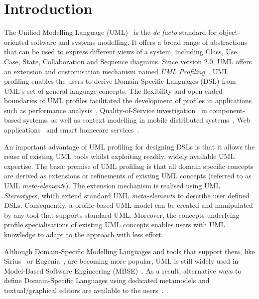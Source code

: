 \section{Introduction}
\label{sec:introduction}

The Unified Modelling Language (UML)~\cite{UML2015OMG} is the \emph{de facto} standard for object-oriented software and systems modelling. 
It offers a broad range of abstractions that can be used to express different views of a system, including Class, Use Case, State, Collaboration and Sequence diagrams. 
Since version 2.0, UML offers an extension and customisation mechanism named \emph{UML Profiling}~\cite{FuentesFernandez2004:UMLME}.
UML profiling enables the users to derive Domain-Specific Languages (DSL) from UML's set of general language concepts.
The flexibility and open-ended boundaries of UML profiles facilitated the development of profiles in applications such as performance analysis~\cite{xu2003performance}, Quality-of-Service investigation~\cite{cortellessa2004towards} in component-based systems, as well as context modelling in mobile distributed systems~\cite{Simons2007:JVLC}, Web applications~\cite{Moreno2007:IETS} and smart homecare services~\cite{Walderhaug2009:MODELS}. 

An important advantage of UML profiling for designing DSLs is that it allows the reuse of existing UML tools whilst exploiting readily, widely available UML expertise.
The basic premise of UML profiling is that all domain specific concepts are derived as extensions or refinements of existing UML concepts (referred to as UML \textit{meta-element}s). 
The extension mechanism is realised using UML \textit{Stereotype}s, which extend standard UML \textit{meta-elements} to describe user defined DSLs. 
Consequently, a profile-based UML model can be created and manipulated by any tool that supports standard UML. 
Moreover, the concepts underlying profile specialisations of existing UML concepts enables users with UML knowledge to adapt to the approach with less effort.

Although Domain-Specific Modelling Languages and tools that support them, like Sirius~\cite{viyovic2014sirius}  or Eugenia~\cite{kolovos2015eugenia}, are becoming more popular, UML is still widely used in Model-Based Software Engineering (MBSE)~\cite{erickson2007theoretical}. 
As a result, alternative ways to define Domain-Specific Languages using dedicated metamodels and textual/graphical editors are available to the users~\cite{Bergmayr2014:MODELS,Pardillo2010:MODELS}. 

